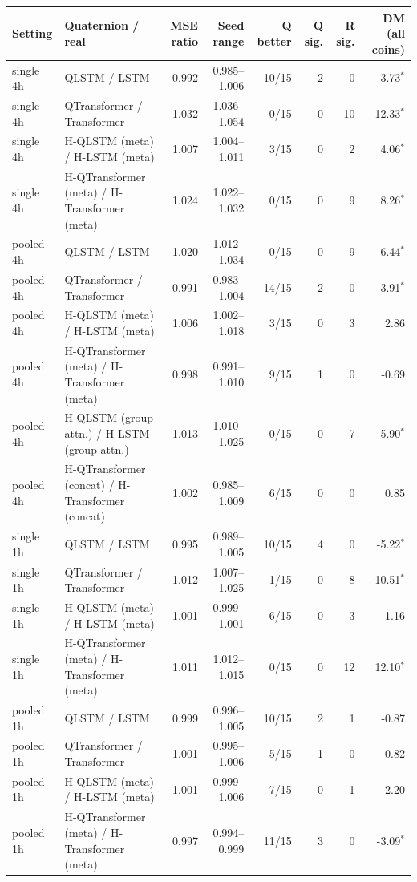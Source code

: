 \begin{tabular}{llrrrrrr}
\toprule
Setting & Quaternion / real & MSE ratio & Seed range & Q better & Q sig. & R sig. & DM (all coins) \\
\midrule
single 4h & QLSTM / LSTM & 0.992 & 0.985--1.006 & 10/15 & 2 & 0 & -3.73$^{*}$ \\
single 4h & QTransformer / Transformer & 1.032 & 1.036--1.054 & 0/15 & 0 & 10 & 12.33$^{*}$ \\
single 4h & H-QLSTM (meta) / H-LSTM (meta) & 1.007 & 1.004--1.011 & 3/15 & 0 & 2 & 4.06$^{*}$ \\
single 4h & H-QTransformer (meta) / H-Transformer (meta) & 1.024 & 1.022--1.032 & 0/15 & 0 & 9 & 8.26$^{*}$ \\
pooled 4h & QLSTM / LSTM & 1.020 & 1.012--1.034 & 0/15 & 0 & 9 & 6.44$^{*}$ \\
pooled 4h & QTransformer / Transformer & 0.991 & 0.983--1.004 & 14/15 & 2 & 0 & -3.91$^{*}$ \\
pooled 4h & H-QLSTM (meta) / H-LSTM (meta) & 1.006 & 1.002--1.018 & 3/15 & 0 & 3 & 2.86 \\
pooled 4h & H-QTransformer (meta) / H-Transformer (meta) & 0.998 & 0.991--1.010 & 9/15 & 1 & 0 & -0.69 \\
pooled 4h & H-QLSTM (group attn.) / H-LSTM (group attn.) & 1.013 & 1.010--1.025 & 0/15 & 0 & 7 & 5.90$^{*}$ \\
pooled 4h & H-QTransformer (concat) / H-Transformer (concat) & 1.002 & 0.985--1.009 & 6/15 & 0 & 0 & 0.85 \\
single 1h & QLSTM / LSTM & 0.995 & 0.989--1.005 & 10/15 & 4 & 0 & -5.22$^{*}$ \\
single 1h & QTransformer / Transformer & 1.012 & 1.007--1.025 & 1/15 & 0 & 8 & 10.51$^{*}$ \\
single 1h & H-QLSTM (meta) / H-LSTM (meta) & 1.001 & 0.999--1.001 & 6/15 & 0 & 3 & 1.16 \\
single 1h & H-QTransformer (meta) / H-Transformer (meta) & 1.011 & 1.012--1.015 & 0/15 & 0 & 12 & 12.10$^{*}$ \\
pooled 1h & QLSTM / LSTM & 0.999 & 0.996--1.005 & 10/15 & 2 & 1 & -0.87 \\
pooled 1h & QTransformer / Transformer & 1.001 & 0.995--1.006 & 5/15 & 1 & 0 & 0.82 \\
pooled 1h & H-QLSTM (meta) / H-LSTM (meta) & 1.001 & 0.999--1.006 & 7/15 & 0 & 1 & 2.20 \\
pooled 1h & H-QTransformer (meta) / H-Transformer (meta) & 0.997 & 0.994--0.999 & 11/15 & 3 & 0 & -3.09$^{*}$ \\

\end{tabular}

